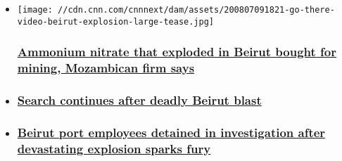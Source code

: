 \begin{itemize}
\item
  \href{/2020/08/07/middleeast/beirut-lebanon-ammonium-nitrate-explosion/index.html}{}

  \texttt{[image: //cdn.cnn.com/cnnnext/dam/assets/200807091821-go-there-video-beirut-explosion-large-tease.jpg]}

  \hypertarget{ammonium-nitrate-that-exploded-in-beirut-bought-for-mining-mozambican-firm-says-}{%
  \subsubsection{\texorpdfstring{\href{/2020/08/07/middleeast/beirut-lebanon-ammonium-nitrate-explosion/index.html}{Ammonium
  nitrate that exploded in Beirut bought for mining, Mozambican firm
  says
  }}{Ammonium nitrate that exploded in Beirut bought for mining, Mozambican firm says }}\label{ammonium-nitrate-that-exploded-in-beirut-bought-for-mining-mozambican-firm-says-}}
\item
  \hypertarget{search-continues-after-deadly-beirut-blast}{%
  \subsubsection{\texorpdfstring{\href{/middleeast/live-news/beirut-lebanon-explosion-08-06-2020/index.html}{Search
  continues after deadly Beirut
  blast}}{Search continues after deadly Beirut blast}}\label{search-continues-after-deadly-beirut-blast}}
\item
  \hypertarget{beirut-port-employees-detained-in-investigation-after-devastating-explosion-sparks-fury}{%
  \subsubsection{\texorpdfstring{\href{/2020/08/06/middleeast/beirut-explosion-anger-intl-hnk/index.html}{Beirut
  port employees detained in investigation after devastating explosion
  sparks
  fury}}{Beirut port employees detained in investigation after devastating explosion sparks fury}}\label{beirut-port-employees-detained-in-investigation-after-devastating-explosion-sparks-fury}}
\end{itemize}

